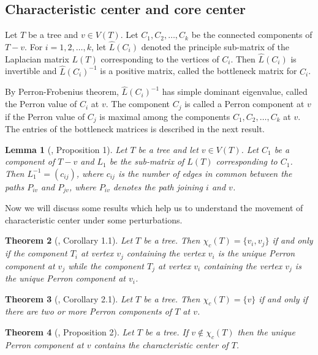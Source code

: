 \documentclass[11pt]{article}
\newtheorem{theorem}{Theorem}[section]
\newtheorem{lemma}[theorem]{Lemma}
\begin{document}
\subsection{Characteristic center and core center}

Let $T$ be a tree and $v\in V(T)$. Let $C_1,C_2,\ldots, C_k$ be the connected components of $T-v$. For $i=1,2,\ldots,k$,  let $\hat{L}(C_i)$ denoted the principle sub-matrix of the Laplacian matrix $L(T)$ corresponding to the vertices  of $C_i$. Then $\hat{L}(C_i)$ is invertible  and $\hat{L}(C_i)^{-1}$ is a positive matrix, called the bottleneck matrix for $C_i$. 

By Perron-Frobenius theorem, $\hat{L}(C_i)^{-1}$ has simple dominant eigenvalue, called the Perron value of $C_i$ at $v$. The component $C_j$ is called a Perron component at $v$ if the Perron value of $C_j$ is maximal among the components  $C_1,C_2,\ldots, C_k$ at $v$. The entries of the bottleneck matrices is described in the next result.

\begin{lemma}[\cite{Kirk2}, Proposition 1]\label{lem:ch1}
Let $T$ be a tree and let $v \in V(T)$. Let $C_1$ be a component of $T-v$ and $L_1$ be the sub-matrix of $L(T)$ corresponding to $C_1$. Then $L_{1}^{-1}=(c_{ij})$, where $c_{ij}$ is the number of edges in common between the paths $P_{iv}$ and $P_{jv}$, where $P_{iv}$ denotes the path joining $i$ and $v$. 
\end{lemma}

Now we will discuss some results which help us to understand the movement of characteristic center under some perturbations.

\begin{theorem}[\cite{Kirk2}, Corollary 1.1]\label{thm:ch1}
Let $T$ be a tree. Then  $\chi_c(T)=\{v_i,v_j\}$  if and only if the component $T_i$ at vertex $v_j$ containing the vertex $v_i$ is the unique Perron component at $v_j$ while the component $T_j$ at vertex $v_i$ containing the vertex $v_j$ is the unique Perron component at $v_i$.
\end{theorem}

\begin{theorem}[\cite{Kirk2}, Corollary 2.1]\label{thm:ch2}
Let $T$ be a tree. Then $\chi_c(T)=\{ v \}$ if and only if there are two or more Perron components of $T$ at $v$.
\end{theorem} 

\begin{theorem}[\cite{Kirk2}, Proposition 2]\label{thm:ch3}
Let $T$ be a tree. If $v\notin \chi_c(T)$ then the unique Perron component at $v$ contains the characteristic center of $T$.
\end{theorem}
\end{document}
